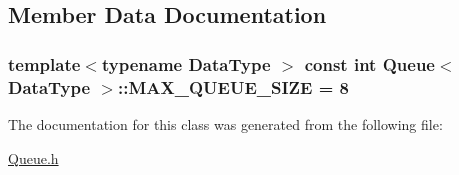 \subsection{\-Member \-Data \-Documentation}
\hypertarget{class_queue_aaf3eed0540baaf6609b48910aacc7133}{
\subsubsection[{\-M\-A\-X\-\_\-\-Q\-U\-E\-U\-E\-\_\-\-S\-I\-Z\-E}]{\setlength{\rightskip}{0pt plus 5cm}template$<$typename Data\-Type $>$ const int {\bf \-Queue}$<$ \-Data\-Type $>$\-::{\bf \-M\-A\-X\-\_\-\-Q\-U\-E\-U\-E\-\_\-\-S\-I\-Z\-E} = 8}}\label{class_queue_aaf3eed0540baaf6609b48910aacc7133}


\-The documentation for this class was generated from the following file\-:\begin{DoxyCompactItemize}
\item 
\hyperlink{_queue_8h}{\-Queue.\-h}\end{DoxyCompactItemize}
